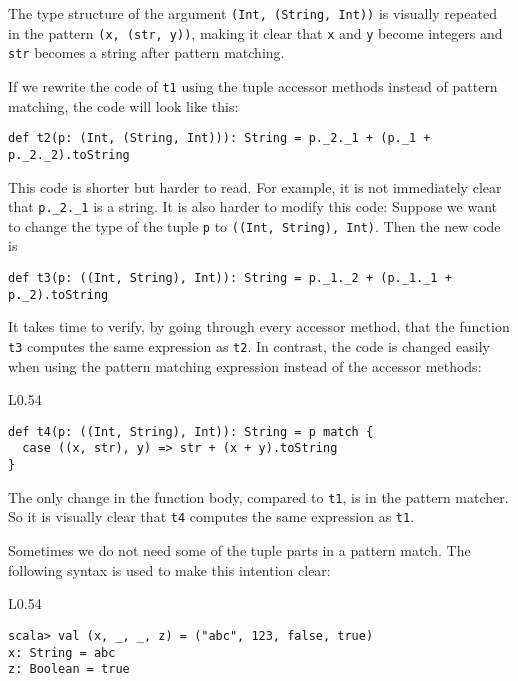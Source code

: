 \noindent The type structure of the argument \lstinline!(Int, (String, Int))!
is visually repeated in the pattern \lstinline!(x, (str, y))!, making
it clear that \lstinline!x! and \lstinline!y! become integers and
\lstinline!str! becomes a string after pattern matching.

If we rewrite the code of \lstinline!t1! using the tuple accessor
methods instead of pattern matching, the code will look like this:
\begin{lstlisting}
def t2(p: (Int, (String, Int))): String = p._2._1 + (p._1 + p._2._2).toString
\end{lstlisting}
This code is shorter but harder to read. For example, it is not immediately
clear that \lstinline!p._2._1! is a string. It is also harder to
modify this code: Suppose we want to change the type of the tuple
\lstinline!p! to \lstinline!((Int, String), Int)!. Then the new
code is
\begin{lstlisting}
def t3(p: ((Int, String), Int)): String = p._1._2 + (p._1._1 + p._2).toString
\end{lstlisting}
It takes time to verify, by going through every accessor method, that
the function \lstinline!t3! computes the same expression as \lstinline!t2!.
In contrast, the code is changed easily when using the pattern matching
expression instead of the accessor methods:\hfill{}~\begin{wrapfigure}{L}{0.54\columnwidth}%
\vspace{-0.8\baselineskip}
\begin{lstlisting}
def t4(p: ((Int, String), Int)): String = p match {
  case ((x, str), y) => str + (x + y).toString
}
\end{lstlisting}
\vspace{-0.6\baselineskip}
\end{wrapfigure}%

\noindent The only change in the function body, compared to \lstinline!t1!,
is in the pattern matcher. So it is visually clear that \lstinline!t4!
computes the same expression as \lstinline!t1!.

Sometimes we do not need some of the tuple parts in a pattern match.
The following syntax is used to make this intention clear:

\begin{wrapfigure}{L}{0.54\columnwidth}%
\vspace{-0.8\baselineskip}
\begin{lstlisting}
scala> val (x, _, _, z) = ("abc", 123, false, true)
x: String = abc
z: Boolean = true
\end{lstlisting}
\vspace{-0.6\baselineskip}
\end{wrapfigure}%

